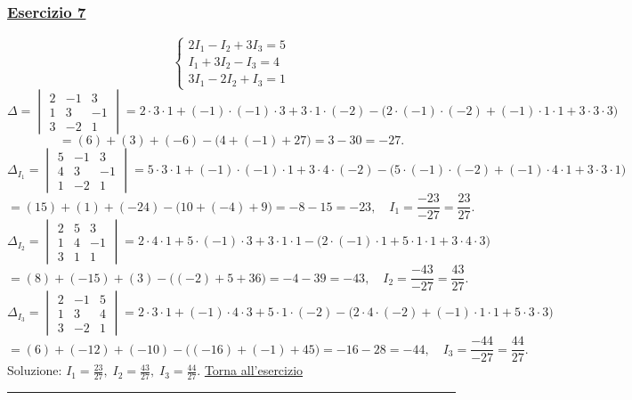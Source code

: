 \subsubsection*{\hyperref[ex:7]{Esercizio 7}}
\[
\begin{cases}
2I_1 - I_2 + 3I_3 = 5 \\
I_1 + 3I_2 - I_3 = 4 \\
3I_1 - 2I_2 + I_3 = 1
\end{cases}
\]
\[
\Delta = \begin{vmatrix}
2 & -1 & 3 \\
1 & 3 & -1 \\
3 & -2 & 1
\end{vmatrix}
= 2\cdot3\cdot1 + (-1)\cdot(-1)\cdot3 + 3\cdot1\cdot(-2)
      - \bigl(2\cdot(-1)\cdot(-2) + (-1)\cdot1\cdot1 + 3\cdot3\cdot3\bigr)
\]
\[
= (6) + (3) + (-6) - \bigl(4 + (-1) + 27\bigr) = 3 - 30 = -27.
\]
\[
\Delta_{I_1} = \begin{vmatrix}
5 & -1 & 3 \\
4 & 3 & -1 \\
1 & -2 & 1
\end{vmatrix}
= 5\cdot3\cdot1 + (-1)\cdot(-1)\cdot1 + 3\cdot4\cdot(-2)
      - \bigl(5\cdot(-1)\cdot(-2) + (-1)\cdot4\cdot1 + 3\cdot3\cdot1\bigr)
\]
\[
= (15) + (1) + (-24) - \bigl(10 + (-4) + 9\bigr) = -8 - 15 = -23,\quad I_1 = \frac{-23}{-27} = \frac{23}{27}.
\]
\[
\Delta_{I_2} = \begin{vmatrix}
2 & 5 & 3 \\
1 & 4 & -1 \\
3 & 1 & 1
\end{vmatrix}
= 2\cdot4\cdot1 + 5\cdot(-1)\cdot3 + 3\cdot1\cdot1
      - \bigl(2\cdot(-1)\cdot1 + 5\cdot1\cdot1 + 3\cdot4\cdot3\bigr)
\]
\[
= (8) + (-15) + (3) - \bigl((-2) + 5 + 36\bigr) = -4 - 39 = -43,\quad I_2 = \frac{-43}{-27} = \frac{43}{27}.
\]
\[
\Delta_{I_3} = \begin{vmatrix}
2 & -1 & 5 \\
1 & 3 & 4 \\
3 & -2 & 1
\end{vmatrix}
= 2\cdot3\cdot1 + (-1)\cdot4\cdot3 + 5\cdot1\cdot(-2)
      - \bigl(2\cdot4\cdot(-2) + (-1)\cdot1\cdot1 + 5\cdot3\cdot3\bigr)
\]
\[
= (6) + (-12) + (-10) - \bigl((-16) + (-1) + 45\bigr) = -16 - 28 = -44,\quad I_3 = \frac{-44}{-27} = \frac{44}{27}.
\]
Soluzione: \(\displaystyle I_1 = \frac{23}{27},\; I_2 = \frac{43}{27},\; I_3 = \frac{44}{27}\). \hfill \hyperlink{ex:7}{Torna all'esercizio}\\
\hrule




